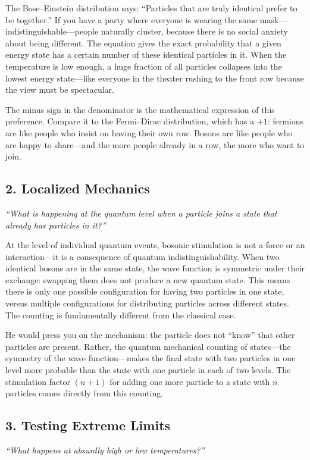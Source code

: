 \documentclass[11pt,openright]{book}
\begin{document}
The Bose--Einstein distribution says: ``Particles that are truly identical prefer to be together.'' If you have a party where everyone is wearing the same mask---indistinguishable---people naturally cluster, because there is no social anxiety about being different. The equation gives the exact probability that a given energy state has a certain number of these identical particles in it. When the temperature is low enough, a huge fraction of all particles collapses into the lowest energy state---like everyone in the theater rushing to the front row because the view must be spectacular.

The minus sign in the denominator is the mathematical expression of this preference. Compare it to the Fermi--Dirac distribution, which has a $+1$: fermions are like people who insist on having their own row. Bosons are like people who are happy to share---and the more people already in a row, the more who want to join.

\subsection*{2. Localized Mechanics}
\textit{``What is happening at the quantum level when a particle joins a state that already has particles in it?''}

At the level of individual quantum events, bosonic stimulation is not a force or an interaction---it is a consequence of quantum indistinguishability. When two identical bosons are in the same state, the wave function is symmetric under their exchange: swapping them does not produce a new quantum state. This means there is only one possible configuration for having two particles in one state, versus multiple configurations for distributing particles across different states. The counting is fundamentally different from the classical case.

He would press you on the mechanism: the particle does not ``know'' that other particles are present. Rather, the quantum mechanical counting of states---the symmetry of the wave function---makes the final state with two particles in one level more probable than the state with one particle in each of two levels. The stimulation factor $(n+1)$ for adding one more particle to a state with $n$ particles comes directly from this counting.

\subsection*{3. Testing Extreme Limits}
\textit{``What happens at absurdly high or low temperatures?''}
\end{document}
